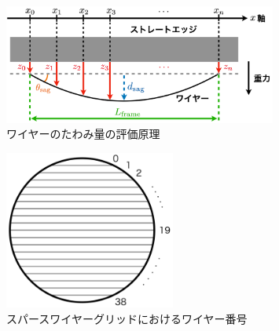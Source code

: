 \documentclass[../../main.tex]{subfiles}
\begin{document}
\begin{figure}[H]
    \centering
    \includegraphics[width=0.8\textwidth]{wiresag/wiresag_concept.pdf}
    \caption{ワイヤーのたわみ量の評価原理}
    \label{fig:wiresag_concept}
\end{figure}
\begin{figure}[H]
    \centering
    \includegraphics[width=0.5\textwidth]{wiresag/wire_number.pdf}
    \caption{スパースワイヤーグリッドにおけるワイヤー番号}
    \label{fig:wire_number}
\end{figure}
\end{document}
